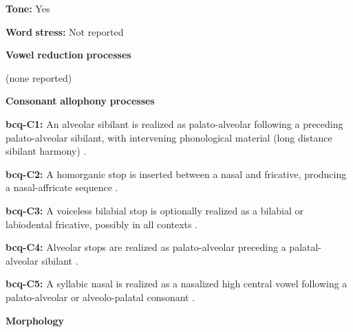 \begin{styleBody}
\textbf{Tone:} Yes
\end{styleBody}

\begin{styleBody}
\textbf{Word} \textbf{stress:} Not reported
\end{styleBody}

\begin{styleBody}
\textbf{Vowel} \textbf{reduction} \textbf{processes}
\end{styleBody}

\begin{styleBody}
(none reported)
\end{styleBody}

\begin{styleBody}
\textbf{Consonant} \textbf{allophony} \textbf{processes}
\end{styleBody}

\begin{styleBody}
\textbf{bcq-C1:} An alveolar sibilant is realized as palato-alveolar following a preceding palato-alveolar sibilant, with intervening phonological material (long distance sibilant harmony) \citep[67]{Rapold2006}.
\end{styleBody}

\begin{styleBody}
\textbf{bcq-C2:} A homorganic stop is inserted between a nasal and fricative, producing a nasal-affricate sequence \citep[69]{Rapold2006}.
\end{styleBody}

\begin{styleBody}
\textbf{bcq-C3:} A voiceless bilabial stop is optionally realized as a bilabial or labiodental fricative, possibly in all contexts \citep[73]{Rapold2006}.
\end{styleBody}

\begin{styleBody}
\textbf{bcq-C4:} Alveolar stops are realized as palato-alveolar preceding a palatal-alveolar sibilant \citep[74]{Rapold2006}.
\end{styleBody}

\begin{styleBody}
\textbf{bcq-C5:} A syllabic nasal is realized as a nasalized high central vowel following a palato-alveolar or alveolo-palatal consonant \citep[76]{Rapold2006}.
\end{styleBody}

\begin{styleBody}
\textbf{Morphology}
\end{styleBody}

